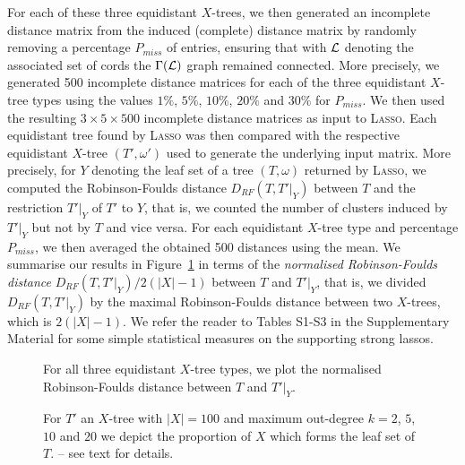 For each of these three equidistant $X$-trees, we then generated an incomplete
distance matrix from the induced (complete) distance matrix by randomly
removing a percentage $P_{miss}$ of entries, ensuring that with $\cL$ denoting
the associated set of cords the $\Gamma(\cL)$ graph remained connected. More
precisely, we generated 500 incomplete distance matrices for each of the three
equidistant $X$-tree types using the values $1\%$, $5\%$, $10\%$, $20\%$ and
$30\%$ for $P_{miss}$.  We then used the resulting $3 \times 5 \times 500$
incomplete distance matrices as input to \textsc{Lasso}. Each equidistant tree
found by \textsc{Lasso} was then compared with the respective equidistant
$X$-tree $(T',\omega')$ used to generate the underlying input matrix. More
precisely, for $Y$ denoting the leaf set of a tree $(T,\omega)$ returned by
\textsc{Lasso}, we computed the Robinson-Foulds distance
\cite{robinson1981comparison} $D_{RF}(T,T'|_Y)$ between $T$ and the
restriction $T'|_Y$ of $T'$ to $Y$, that is, we counted the number of clusters
induced by $T'|_Y$ but not by $T$ and vice versa.  For each equidistant
$X$-tree type and percentage $P_{miss}$, we then averaged the obtained 500
distances using the mean. We summarise our results in
Figure~\ref{fig:rob-foulds-shapes} in terms of the {\em normalised
  Robinson-Foulds distance} $D_{RF}(T,T'|_Y)/2(|X|-1)$ between $T$ and
$T'|_Y$, that is, we divided $D_{RF}(T,T'|_Y)$ by the maximal Robinson-Foulds
distance between two $X$-trees, which is $2(|X|-1)$. We refer the reader to
Tables S1-S3 in the Supplementary Material for some simple statistical
measures on the supporting strong lassos.

\begin{figure}
  \centering
  \begin{tikzpicture}
    
  \end{tikzpicture}
  \endpgfgraphicnamed  
  \caption{For all three equidistant $X$-tree types, we plot the normalised
    Robinson-Foulds distance between $T$ and $T'|_Y$.}
  \label{fig:rob-foulds-shapes}
\end{figure}

\begin{figure}
  \centering
  \begin{tikzpicture}
    
  \end{tikzpicture}
  \endpgfgraphicnamed  
  \caption{For $T'$ an $X$-tree with $|X|=100$ and maximum out-degree $k= 2$,
    $5$, $10$ and $20$ we depict the proportion of $X$ which forms the leaf
    set of $T$. -- see text for details.  }
  \label{fig:simulation-nleaves}
\end{figure}

